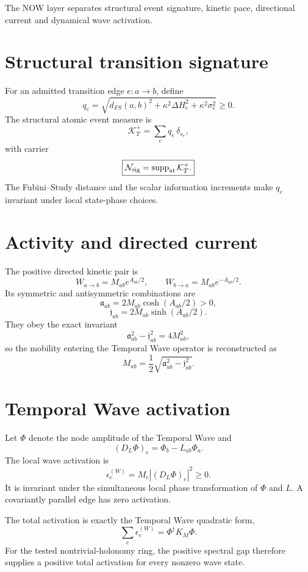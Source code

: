 \documentclass[11pt]{book}
\begin{document}
The NOW layer separates structural event signature, kinetic pace, directional current and dynamical wave activation.

\section{Structural transition signature}

For an admitted transition edge $e:a\to b$, define
\[
\boxed{
q_e=
\sqrt{
 d_{FS}(a,b)^2
 +\kappa^2\Delta H_e^2
 +\kappa^2\sigma_e^2
}\ge0.
}
\]
The structural atomic event measure is
\[
\mathcal K_T^+
=\sum_e q_e\,\delta_{s_e},
\]
with carrier
\[
\boxed{
\mathcal N_{\rm sig}
=\operatorname{supp}_{\rm at}\mathcal K_T^+.
}
\]
The Fubini--Study distance and the scalar information increments make $q_e$ invariant under local state-phase choices.

\section{Activity and directed current}

The positive directed kinetic pair is
\[
W_{a\to b}=M_{ab}e^{A_{ab}/2},
\qquad
W_{b\to a}=M_{ab}e^{-A_{ab}/2}.
\]
Its symmetric and antisymmetric combinations are
\[
\boxed{
\mathfrak a_{ab}=2M_{ab}\cosh(A_{ab}/2)>0,
}
\]
\[
\boxed{
\mathfrak j_{ab}=2M_{ab}\sinh(A_{ab}/2).
}
\]
They obey the exact invariant
\[
\boxed{
\mathfrak a_{ab}^2-\mathfrak j_{ab}^2=4M_{ab}^2,
}
\]
so the mobility entering the Temporal Wave operator is reconstructed as
\[
\boxed{
M_{ab}
=\frac12\sqrt{\mathfrak a_{ab}^2-\mathfrak j_{ab}^2}.
}
\]

\section{Temporal Wave activation}

Let $\Phi$ denote the node amplitude of the Temporal Wave and
\[
(D_L\Phi)_e=\Phi_b-L_{ab}\Phi_a.
\]
The local wave activation is
\[
\boxed{
\epsilon_e^{(W)}
=M_e|(D_L\Phi)_e|^2\ge0.
}
\]
It is invariant under the simultaneous local phase transformation of $\Phi$ and $L$.  A covariantly parallel edge has zero activation.

The total activation is exactly the Temporal Wave quadratic form,
\[
\boxed{
\sum_e\epsilon_e^{(W)}
=\Phi^\dagger K_M\Phi.
}
\]
For the tested nontrivial-holonomy ring, the positive spectral gap therefore supplies a positive total activation for every nonzero wave state.
\end{document}
